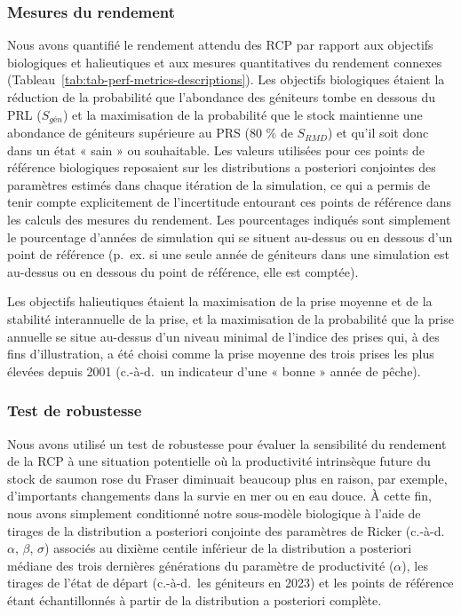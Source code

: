 \documentclass[french,11pt]{book}
\begin{document}
\hypertarget{mesures-du-rendement}{%
\subsubsection{Mesures du rendement}\label{mesures-du-rendement}}

Nous avons quantifié le rendement attendu des RCP par rapport aux objectifs biologiques et halieutiques et aux mesures quantitatives du rendement connexes (Tableau~\ref{tab:tab-perf-metrics-descriptions}). Les objectifs biologiques étaient la réduction de la probabilité que l'abondance des géniteurs tombe en dessous du PRL (\(S_{gén}\)) et la maximisation de la probabilité que le stock maintienne une abondance de géniteurs supérieure au PRS (80 \% de \(S_{RMD}\)) et qu'il soit donc dans un état « sain » ou souhaitable. Les valeurs utilisées pour ces points de référence biologiques reposaient sur les distributions a posteriori conjointes des paramètres estimés dans chaque itération de la simulation, ce qui a permis de tenir compte explicitement de l'incertitude entourant ces points de référence dans les calculs des mesures du rendement. Les pourcentages indiqués sont simplement le pourcentage d'années de simulation qui se situent au-dessus ou en dessous d'un point de référence (p.~ex. si une seule année de géniteurs dans une simulation est au-dessus ou en dessous du point de référence, elle est comptée).

Les objectifs halieutiques étaient la maximisation de la prise moyenne et de la stabilité interannuelle de la prise, et la maximisation de la probabilité que la prise annuelle se situe au-dessus d'un niveau minimal de l'indice des prises qui, à des fins d'illustration, a été choisi comme la prise moyenne des trois prises les plus élevées depuis 2001 (c.-à-d.~un indicateur d'une « bonne » année de pêche).

\hypertarget{test-de-robustesse}{%
\subsubsection{Test de robustesse}\label{test-de-robustesse}}

Nous avons utilisé un test de robustesse pour évaluer la sensibilité du rendement de la RCP à une situation potentielle où la productivité intrinsèque future du stock de saumon rose du Fraser diminuait beaucoup plus en raison, par exemple, d'importants changements dans la survie en mer ou en eau douce. À cette fin, nous avons simplement conditionné notre sous-modèle biologique à l'aide de tirages de la distribution a posteriori conjointe des paramètres de Ricker (c.-à-d.~\(\alpha\), \(\beta\), \(\sigma\)) associés au dixième centile inférieur de la distribution a posteriori médiane des trois dernières générations du paramètre de productivité (\(\alpha\)), les tirages de l'état de départ (c.-à-d.~les géniteurs en 2023) et les points de référence étant échantillonnés à partir de la distribution a posteriori complète.
\end{document}
